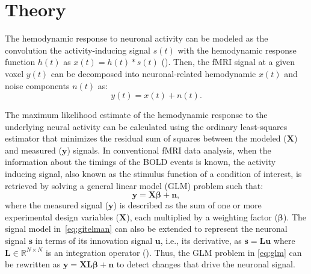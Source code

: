 \section{Theory}


The hemodynamic response to neuronal activity can be modeled as the convolution the activity-inducing signal \(s(t)\) with the hemodynamic response function \(h(t)\) as \(x(t) = h(t) * s(t)\) (\citealt{gitelman2003ModelingRegionalPsychophysiologic}). Then, the fMRI signal at a given voxel \(y(t)\) can be decomposed into neuronal-related hemodynamic \(x(t)\) and noise components \(n(t)\) as:
\begin{equation}
    \label{eq:gitelman}
    y(t) = x(t) + n(t).
\end{equation}

The maximum likelihood estimate of the hemodynamic response to the underlying neural activity can be calculated using the ordinary least-squares estimator that minimizes the residual sum of squares between the modeled (\(\mathbf{X}\)) and measured (\(\mathbf{y}\)) signals. In conventional fMRI data analysis, when the information about the timings of the BOLD events is known, the activity inducing signal, also known as the stimulus function of a condition of interest, is retrieved by solving a general linear model (GLM) problem such that:
\begin{equation}
    \label{eq:glm}
    \mathbf{y} = \mathbf{X \beta} + \mathbf{n},
\end{equation}
where the measured signal (\(\mathbf{y}\)) is described as the sum of one or more experimental design variables (\(\mathbf{X}\)), each multiplied by a weighting factor (\(\mathbf{\beta}\)). The signal model in~\eqref{eq:gitelman} can also be extended to represent the neuronal signal \(\mathbf{s}\) in terms of its innovation signal \(\mathbf{u}\), i.e., its derivative, as \(\mathbf{s} = \mathbf{Lu}\) where \(\mathbf{L} \in \mathbb{R}^{N \times N}\) is an integration operator (\citealt{cherkaoui2019SparsitybasedBlindDeconvolution,urunuela2020StabilityBasedSparseParadigm}). Thus, the GLM problem in \eqref{eq:glm} can be rewritten as \(\mathbf{y} = \mathbf{X L \beta} + \mathbf{n}\) to detect changes that drive the neuronal signal.

